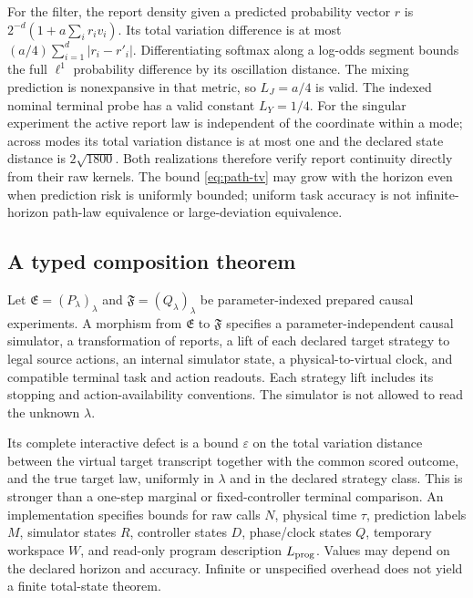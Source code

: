For the filter, the report density given a predicted probability vector $r$ is $2^{-d}(1+a\sum_i r_i v_i)$. Its total variation difference is at most $(a/4)\sum_{i=1}^d|r_i-r'_i|$. Differentiating softmax along a log-odds segment bounds the full $\ell^1$ probability difference by its oscillation distance. The mixing prediction is nonexpansive in that metric, so $L_J=a/4$ is valid. The indexed nominal terminal probe has a valid constant $L_Y=1/4$. For the singular experiment the active report law is independent of the coordinate within a mode; across modes its total variation distance is at most one and the declared state distance is $2\sqrt{1800}$. Both realizations therefore verify report continuity directly from their raw kernels. The bound \eqref{eq:path-tv} may grow with the horizon even when prediction risk is uniformly bounded; uniform task accuracy is not infinite-horizon path-law equivalence or large-deviation equivalence.

\subsection{A typed composition theorem}
Let $\mathfrak E=(P_\lambda)_\lambda$ and $\mathfrak F=(Q_\lambda)_\lambda$ be parameter-indexed prepared causal experiments. A morphism from $\mathfrak E$ to $\mathfrak F$ specifies a parameter-independent causal simulator, a transformation of reports, a lift of each declared target strategy to legal source actions, an internal simulator state, a physical-to-virtual clock, and compatible terminal task and action readouts. Each strategy lift includes its stopping and action-availability conventions. The simulator is not allowed to read the unknown $\lambda$.

Its complete interactive defect is a bound $\varepsilon$ on the total variation distance between the virtual target transcript together with the common scored outcome, and the true target law, uniformly in $\lambda$ and in the declared strategy class. This is stronger than a one-step marginal or fixed-controller terminal comparison. An implementation specifies bounds for raw calls $N$, physical time $\tau$, prediction labels $M$, simulator states $R$, controller states $D$, phase/clock states $Q$, temporary workspace $W$, and read-only program description $L_{\rm prog}$. Values may depend on the declared horizon and accuracy. Infinite or unspecified overhead does not yield a finite total-state theorem.

